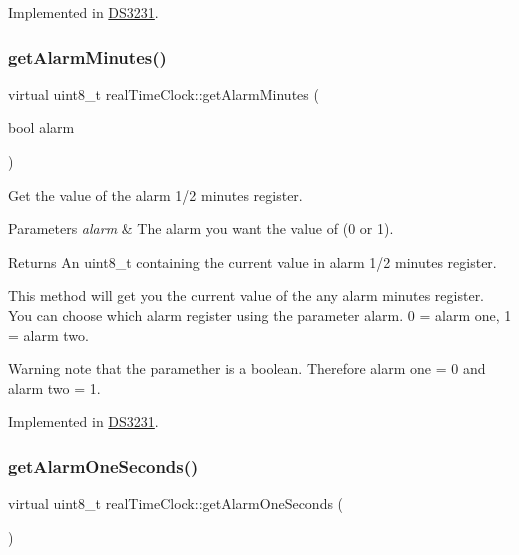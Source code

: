 Implemented in \mbox{\hyperlink{class_d_s3231_a8dc2f4546600209d16f109764c2f4434}{D\+S3231}}.

\mbox{\label{classreal_time_clock_a0b3babca96f8246d4bb5e3ac2a95801d}} 
\subsubsection{\texorpdfstring{get\+Alarm\+Minutes()}{getAlarmMinutes()}}
{\footnotesize\ttfamily virtual uint8\+\_\+t real\+Time\+Clock\+::get\+Alarm\+Minutes (\begin{DoxyParamCaption}\item[{bool}]{alarm }\end{DoxyParamCaption})\hspace{0.3cm}{\ttfamily [pure virtual]}}



Get the value of the alarm 1/2 minutes register. 


\begin{DoxyParams}{Parameters}
{\em alarm} & The alarm you want the value of (0 or 1). \\
\hline
\end{DoxyParams}
\begin{DoxyReturn}{Returns}
An uint8\+\_\+t containing the current value in alarm 1/2 minutes register.
\end{DoxyReturn}
This method will get you the current value of the any alarm minutes register. You can choose which alarm register using the parameter alarm. 0 = alarm one, 1 = alarm two. \begin{DoxyWarning}{Warning}
note that the paramether is a boolean. Therefore alarm one = 0 and alarm two = 1. 
\end{DoxyWarning}


Implemented in \mbox{\hyperlink{class_d_s3231_ae11a0dcc34e9c8a9b875989172339957}{D\+S3231}}.

\mbox{\label{classreal_time_clock_af4ff1775432a08af7e41db135d16bf65}} 
\subsubsection{\texorpdfstring{get\+Alarm\+One\+Seconds()}{getAlarmOneSeconds()}}
{\footnotesize\ttfamily virtual uint8\+\_\+t real\+Time\+Clock\+::get\+Alarm\+One\+Seconds (\begin{DoxyParamCaption}{ }\end{DoxyParamCaption})\hspace{0.3cm}{\ttfamily [pure virtual]}}




